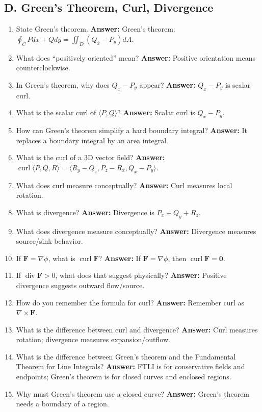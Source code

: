 \documentclass[11pt]{article}
\newcommand{\curl}{\operatorname{curl}}
\newcommand{\divg}{\operatorname{div}}
\begin{document}
\subsection*{D. Green's Theorem, Curl, Divergence}
\begin{enumerate}
\item State Green's theorem. \textbf{Answer:} Green's theorem: $\oint_C Pdx+Qdy=\iint_D(Q_x-P_y)dA$.
\item What does ``positively oriented'' mean? \textbf{Answer:} Positive orientation means counterclockwise.
\item In Green's theorem, why does $Q_x-P_y$ appear? \textbf{Answer:} $Q_x-P_y$ is scalar curl.
\item What is the scalar curl of $\langle P,Q\rangle$? \textbf{Answer:} Scalar curl is $Q_x-P_y$.
\item How can Green's theorem simplify a hard boundary integral? \textbf{Answer:} It replaces a boundary integral by an area integral.
\item What is the curl of a 3D vector field? \textbf{Answer:} $\curl\langle P,Q,R\rangle=\langle R_y-Q_z,P_z-R_x,Q_x-P_y\rangle$.
\item What does curl measure conceptually? \textbf{Answer:} Curl measures local rotation.
\item What is divergence? \textbf{Answer:} Divergence is $P_x+Q_y+R_z$.
\item What does divergence measure conceptually? \textbf{Answer:} Divergence measures source/sink behavior.
\item If $\mathbf F=\nabla\phi$, what is $\curl \mathbf F$? \textbf{Answer:} If $\mathbf F=\nabla\phi$, then $\curl\mathbf F=\mathbf0$.
\item If $\divg \mathbf F>0$, what does that suggest physically? \textbf{Answer:} Positive divergence suggests outward flow/source.
\item How do you remember the formula for curl? \textbf{Answer:} Remember curl as $\nabla\times\mathbf F$.
\item What is the difference between curl and divergence? \textbf{Answer:} Curl measures rotation; divergence measures expansion/outflow.
\item What is the difference between Green's theorem and the Fundamental Theorem for Line Integrals? \textbf{Answer:} FTLI is for conservative fields and endpoints; Green's theorem is for closed curves and enclosed regions.
\item Why must Green's theorem use a closed curve? \textbf{Answer:} Green's theorem needs a boundary of a region.
\end{enumerate}
\end{document}
